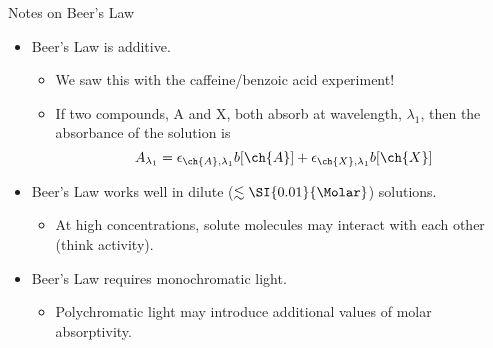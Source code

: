 \documentclass[notes=only]{beamer}
\begin{document}
\begin{frame}{Notes on Beer's Law}
	\begin{itemize}
		\item Beer's Law is \alert{additive}.
			\begin{itemize}
				\item We saw this with the caffeine/benzoic acid
					experiment!
				\item If two compounds, A and X, both absorb at
					wavelength, $\lambda_1$, then the
					absorbance of the solution is
					\begin{equation*}
						A_{\lambda_1} =
						\epsilon_{\ch{A},\lambda_1} b
						[\ch{A}] +
						\epsilon_{\ch{X},\lambda_1} b
						[\ch{X}]
					\end{equation*}
			\end{itemize}
		\item Beer's Law works well in \alert{dilute} ($\lesssim
			\SI{0.01}{\Molar}$) solutions.
			\begin{itemize}
				\item At high concentrations, solute molecules
					may interact with each other (think
					activity).
			\end{itemize}
		\item Beer's Law requires \alert{monochromatic} light.
			\begin{itemize}
				\item Polychromatic light may introduce
					additional values of molar absorptivity.
			\end{itemize}
	\end{itemize}
\end{frame}
\end{document}
